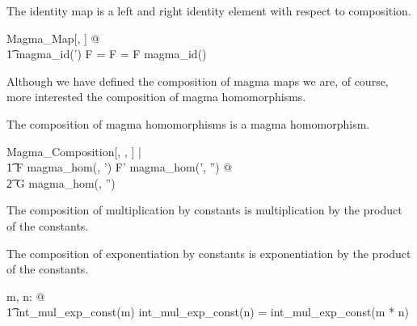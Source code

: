 \documentclass{amsart}
\begin{document}
\begin{remark}
The identity map is a left and right identity element with respect to composition.

\begin{zed}
	\forall Magma\_Map[\setT, \setU] @ \\
	\t1 magma\_id(\strucA') \compMagma F = F = F \compMagma magma\_id(\strucA)
\end{zed}

\end{remark}

Although we have defined the composition of magma maps we are, of course, more interested
the composition of magma homomorphisms.

\begin{remark}
The composition of magma homomorphisms is a magma homomorphism.

\begin{zed}
	\forall Magma\_Composition[\setT, \setU, \setV] | \\
	\t1	F \in magma\_hom(\strucA, \strucA') \land F' \in magma\_hom(\strucA', \strucA'') @ \\
	\t2		G \in magma\_hom(\strucA, \strucA'')
\end{zed}

\end{remark}

\begin{example}
The composition of multiplication by constants is multiplication by the product of the constants.


\end{example}

\begin{example}
The composition of exponentiation by constants is exponentiation by the product of the constants.

\begin{zed}
	\forall m, n: \nat @ \\
	\t1	int\_mul\_exp\_const(m) \compMagma int\_mul\_exp\_const(n) = int\_mul\_exp\_const(m * n)
\end{zed}

\end{example}
\end{document}
